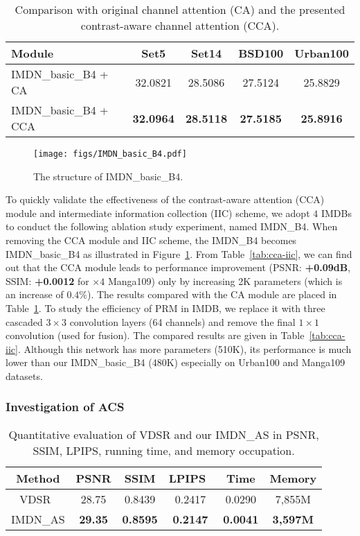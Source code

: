 \documentclass[sigconf]{acmart}
\begin{document}
\begin{table}[htpb]
	\small
	\centering
	\caption{Comparison with original channel attention (CA) and the presented contrast-aware channel attention (CCA).}
	\begin{tabular}{|l|c|c|c|c|}
		\hline
		Module & Set5 & Set14 & BSD100 & Urban100\\
		\hline
		\hline
		IMDN\_basic\_B4 + CA & 32.0821 & 28.5086 & 27.5124 & 25.8829 \\
		IMDN\_basic\_B4 + CCA & \textbf{32.0964} & \textbf{28.5118} & \textbf{27.5185} & \textbf{25.8916} \\
		\hline
	\end{tabular}
	\label{tab:ca-and-cca}
\end{table}

\begin{figure}
	\centering
	\texttt{[image: figs/IMDN\_basic\_B4.pdf]}
	\caption{The structure of IMDN\_basic\_B4.}
	\label{fig:IMDN-basic-B4}
	\vspace{-3mm}
\end{figure}

To quickly validate the effectiveness of the contrast-aware attention (CCA) module and intermediate information collection (IIC) scheme, we adopt $4$ IMDBs to conduct the following ablation study experiment, named IMDN\_B4. When removing the CCA module and IIC scheme, the IMDN\_B4 becomes IMDN\_basic\_B4 as illustrated in Figure~\ref{fig:IMDN-basic-B4}. From Table~\ref{tab:cca-iic}, we can find out that the CCA module leads to performance improvement (PSNR: \textbf{+0.09dB}, SSIM: \textbf{+0.0012} for $\times 4$ Manga109) only by increasing 2K parameters (which is an increase of $0.4\% $). The results compared with the CA module are placed in Table~\ref{tab:ca-and-cca}. To study the efficiency of PRM in IMDB, we replace it with three cascaded $3 \times 3$ convolution layers (64 channels) and remove the final $1 \times 1$ convolution (used for fusion). The compared results are given in Table~\ref{tab:cca-iic}. Although this network has more parameters (510K), its performance is much lower than our IMDN\_basic\_B4 (480K) especially on Urban100 and Manga109 datasets.

\subsubsection{Investigation of ACS}
\begin{table}[htpb]
	\centering
	\small
	\caption{Quantitative evaluation of VDSR and our IMDN\_AS in PSNR, SSIM, LPIPS, running time, and memory occupation.}
	\label{fig:study-acs}
	\begin{tabular}{|c|c|c|c|c|c|}
		\hline
		Method & PSNR & SSIM & LPIPS~\cite{LPIPS} & Time & Memory \\
		\hline
		VDSR~\cite{VDSR} & 28.75 & 0.8439 & 0.2417 & 0.0290 & 7,855M \\ 
		IMDN\_AS & \textbf{29.35} & \textbf{0.8595} & \textbf{0.2147} & \textbf{0.0041} & \textbf{3,597M} \\
		\hline
	\end{tabular}
\end{table}
\end{document}
